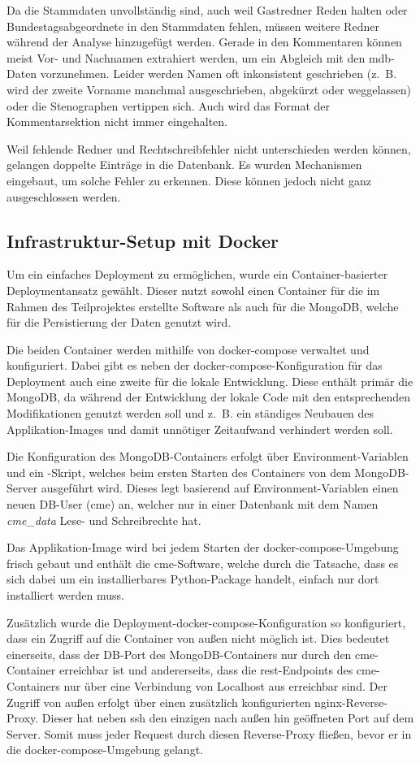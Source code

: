Da die Stammdaten unvollständig sind, auch weil Gastredner Reden halten oder
Bundestagsabgeordnete in den Stammdaten fehlen, müssen weitere Redner während
der Analyse hinzugefügt werden. Gerade in den Kommentaren können meist Vor-
und Nachnamen extrahiert werden, um ein Abgleich mit den \gls{mdb}-Daten
vorzunehmen. Leider werden Namen oft inkonsistent geschrieben (z.~B. wird
der zweite Vorname manchmal ausgeschrieben, abgekürzt oder weggelassen) oder
die Stenographen vertippen sich. Auch wird das Format der Kommentarsektion
nicht immer eingehalten.

Weil fehlende Redner und Rechtschreibfehler nicht unterschieden werden können,
gelangen doppelte Einträge in die Datenbank. Es wurden Mechanismen eingebaut,
um solche Fehler zu erkennen. Diese können jedoch nicht ganz ausgeschlossen werden.

\subsection{Infrastruktur-Setup mit Docker}
Um ein einfaches Deployment zu ermöglichen, wurde ein Container-basierter
Deploymentansatz gewählt. Dieser nutzt sowohl einen Container für die im
Rahmen des Teilprojektes erstellte Software als auch für die MongoDB, welche
für die Persistierung der Daten genutzt wird.

Die beiden Container werden mithilfe von docker-compose verwaltet und
konfiguriert. Dabei gibt es neben der docker-compose-Konfiguration für das
Deployment auch eine zweite für die lokale Entwicklung. Diese enthält primär
die MongoDB, da während der Entwicklung der lokale Code mit den entsprechenden
Modifikationen genutzt werden soll und z.~B. ein ständiges Neubauen des
Applikation-Images und damit unnötiger Zeitaufwand verhindert werden soll.

Die Konfiguration des MongoDB-Containers erfolgt über Environment-Variablen
und ein -Skript, welches beim ersten Starten des
Containers von dem MongoDB-Server ausgeführt wird. Dieses legt basierend auf
Environment-Variablen einen neuen DB-User (cme) an, welcher nur in einer
Datenbank mit dem Namen \textit{cme\_data} Lese- und Schreibrechte hat.

Das Applikation-Image wird bei jedem Starten der docker-compose-Umgebung
frisch gebaut und enthält die \gls{cme}-Software, welche durch die Tatsache,
dass es sich dabei um ein installierbares Python-Package handelt, einfach nur
dort installiert werden muss.

Zusätzlich wurde die Deployment-docker-compose-Konfiguration so konfiguriert,
dass ein Zugriff auf die Container von außen nicht möglich ist. Dies bedeutet
einerseits, dass der DB-Port des MongoDB-Containers nur durch den
\gls{cme}-Container erreichbar ist und andererseits, dass die
\gls{rest}-Endpoints des \gls{cme}-Containers nur über eine Verbindung von
Localhost aus erreichbar sind. Der Zugriff von außen erfolgt über einen
zusätzlich konfigurierten nginx-Reverse-Proxy. Dieser hat neben ssh  den
einzigen nach außen hin geöffneten Port auf dem Server. Somit muss jeder
Request durch diesen Reverse-Proxy fließen, bevor er in die
docker-compose-Umgebung gelangt.

